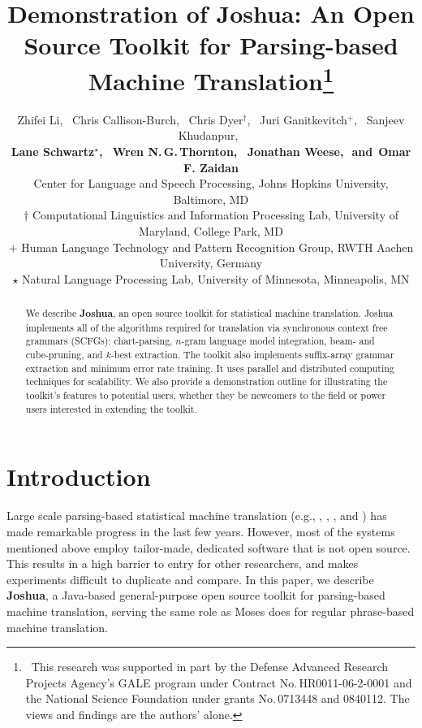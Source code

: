 \documentclass[11pt]{article}
\title{Demonstration of Joshua: An Open Source Toolkit for Parsing-based Machine Translation\thanks{$\;\:$This
research was supported in part by the Defense Advanced Research Projects Agency's GALE program under
Contract No.\,HR0011-06-2-0001 and the National Science Foundation under grants No.\,0713448 and 0840112. The
views and findings are the authors' alone.}}
\author{
Zhifei Li,\,\,\,
Chris Callison-Burch,\,\,\, %
Chris Dyer$^\dagger$,\,\,\,
Juri Ganitkevitch$^+$,\,\,\,
Sanjeev Khudanpur,\,\,\, \\
{\bf Lane Schwartz$^\star$,\,\,\,
Wren N.\,G.\,Thornton,\,\,\,
Jonathan Weese,\,\,
{\textnormal{and}}\,\,\,Omar F. Zaidan}\\
Center for Language and Speech Processing, Johns Hopkins University, Baltimore, MD\\
$\dagger$ Computational Linguistics and Information Processing Lab, University of Maryland, College Park, MD\\
$+$ Human Language Technology and Pattern Recognition Group, RWTH Aachen University, Germany\\
$\star$ Natural Language Processing Lab, University of Minnesota, Minneapolis, MN }
\date{}
\begin{document}
\maketitle


\begin{abstract}

We describe \textbf{Joshua}, an open source toolkit for statistical machine
translation.  Joshua implements all of the algorithms required for translation
via synchronous context free grammars (SCFGs): chart-parsing, $n$-gram language
model integration, beam- and cube-pruning, and $k$-best extraction.  The toolkit
also implements suffix-array grammar extraction and minimum error rate training.
It uses parallel and distributed computing techniques for scalability.  We also
provide a demonstration outline for illustrating the toolkit's features to
potential users, whether they be newcomers to the field or power users interested
in extending the toolkit.

\end{abstract}


\section{Introduction}

Large scale parsing-based statistical machine translation (e.g., ,
, , and ) has made
remarkable progress in the last few years.  However, most of the systems mentioned
above employ tailor-made, dedicated software that is not open source.  This results
in a high barrier to entry for other researchers, and makes experiments difficult to
duplicate and compare.  In this paper, we describe \textbf{Joshua}, a Java-based
general-purpose open source toolkit for parsing-based machine translation, serving the
same role as Moses \cite{Moses} does for regular phrase-based machine translation.

\end{document}
